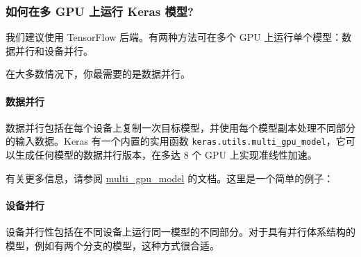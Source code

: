 \subsubsection{如何在多 GPU 上运行 Keras
模型?}\label{how-can-i-run-a-keras-model-on-multiple-gpus}

我们建议使用 TensorFlow 后端。有两种方法可在多个 GPU
上运行单个模型：数据并行和设备并行。

在大多数情况下，你最需要的是数据并行。

\paragraph{数据并行}\label{ux6570ux636eux5e76ux884c}

数据并行包括在每个设备上复制一次目标模型，并使用每个模型副本处理不同部分的输入数据。Keras
有一个内置的实用函数
\texttt{keras.utils.multi\_gpu\_model}，它可以生成任何模型的数据并行版本，在多达
8 个 GPU 上实现准线性加速。

有关更多信息，请参阅 \hyperref[multi-gpu-model]{multi\_gpu\_model}
的文档。这里是一个简单的例子：

\begin{Shaded}
\begin{Highlighting}[]
  

\OperatorTok{=} \OperatorTok{=}\NormalTok{)}
\OperatorTok{=}\NormalTok{,}
                       \OperatorTok{=}\NormalTok{)}

\OperatorTok{=}\OperatorTok{=}\NormalTok{)}
\end{Highlighting}
\end{Shaded}

\paragraph{设备并行}

设备并行性包括在不同设备上运行同一模型的不同部分。对于具有并行体系结构的模型，例如有两个分支的模型，这种方式很合适。

